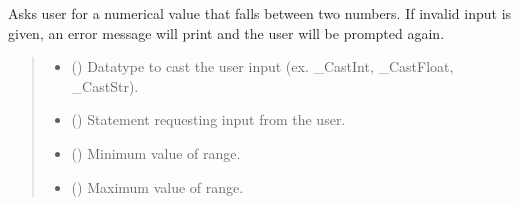 \documentclass[letterpaper,10pt,english]{sphinxmanual}
\begin{document}
\begin{fulllineitems}
\begin{fulllineitems}
\label{\detokenize{Setup.Inputs:Setup.Inputs.GetUserInput.UserInput.AskForTypeInRange}}
\pysigstartsignatures
{}
\pysigstopsignatures
\sphinxAtStartPar
Asks user for a numerical value that falls between two numbers. If invalid input is given, an         error message will print and the user will be prompted again.
\begin{quote}\begin{description}
\begin{itemize}
\item {} 
\sphinxAtStartPar
{} () \textendash{} Datatype to cast the user input (ex. \_CastInt, \_CastFloat, \_CastStr).

\item {} 
\sphinxAtStartPar
{} () \textendash{} Statement requesting input from the user.

\item {} 
\sphinxAtStartPar
{} (\sphinxstyleliteralemphasis{\sphinxupquote{ | }}) \textendash{} Minimum value of range.

\item {} 
\sphinxAtStartPar
{} (\sphinxstyleliteralemphasis{\sphinxupquote{ | }}) \textendash{} Maximum value of range.


\end{itemize}
\end{description}
\end{quote}
\end{fulllineitems}
\end{fulllineitems}
\end{document}
